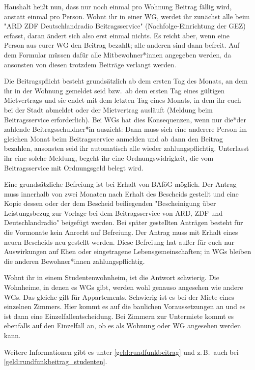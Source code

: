 \begin{multicols*}{2}
Haushalt heißt nun, dass nur noch einmal pro Wohnung Beitrag fällig wird, anstatt einmal pro Person.
Wohnt ihr in einer WG, werdet ihr zunächst alle beim "ARD ZDF Deutschlandradio Beitragsservice" (Nachfolge-Einrichtung der GEZ) erfasst, daran ändert sich also erst einmal nichts.
Es reicht aber, wenn eine Person aus eurer WG den Beitrag bezahlt; alle anderen sind dann befreit.
Auf dem Formular müssen dafür alle Mitbewohner*innen angegeben werden, da ansonsten von diesen trotzdem Beiträge verlangt werden.

Die Beitragspflicht besteht grundsätzlich ab dem ersten Tag des Monats, an dem ihr in der Wohnung gemeldet seid bzw.\ ab dem ersten Tag eines gültigen Mietvertrags und sie endet mit dem letzten Tag eines Monats, in dem ihr euch bei der Stadt abmeldet oder der Mietvertrag ausläuft (Meldung beim Beitragsservice erforderlich).
Bei WGs hat dies Konsequenzen, wenn nur die*der zahlende Beitragsschuldner*in auszieht: Dann muss sich eine anderere Person im gleichen Monat beim Beitragsservice anmelden und ab dann den Beitrag bezahlen, ansonsten seid ihr automatisch alle wieder zahlungspflichtig.
Unterlasst ihr eine solche Meldung, begeht ihr eine Ordnungswidrigkeit, die vom Beitragsservice mit Ordnungsgeld belegt wird.

Eine grundsätzliche Befreiung ist bei Erhalt von BAföG möglich.
Der Antrag muss innerhalb von zwei Monaten nach Erhalt des Bescheids gestellt und eine Kopie dessen oder der dem Bescheid beiliegenden "Bescheinigung über Leistungsbezug zur Vorlage bei dem Beitragsservice von ARD, ZDF und Deutschlandradio" beigefügt werden.
Bei später gestellten Anträgen besteht für die Vormonate kein Anrecht auf Befreiung.
Der Antrag muss mit Erhalt eines neuen Bescheids neu gestellt werden.
Diese Befreiung hat außer für euch nur Auswirkungen auf Ehen oder eingetragene Lebensgemeinschaften; in WGs bleiben die anderen Bewohner*innen zahlungspflichtig.

Wohnt ihr in einem Studentenwohnheim, ist die Antwort schwierig.
Die Wohnheime, in denen es WGs gibt, werden wohl genauso angesehen wie andere WGs.
Das gleiche gilt für Appartements.
Schwierig ist es bei der Miete eines einzelnen Zimmers.
Hier kommt es auf die baulichen Voraussetzungen an und es ist dann eine Einzelfallentscheidung.
Bei Zimmern zur Untermiete kommt es ebenfalls auf den Einzelfall an, ob es als Wohnung oder WG angesehen werden kann.

Weitere Informationen gibt es unter \cref{geld:rundfunkbeitrag} und z.\,B.\ auch bei \cref{geld:rundfunkbeitrag_studenten}.


\end{multicols*}
